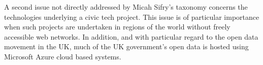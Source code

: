 A second issue not directly addressed by Micah Sifry’s taxonomy concerns the technologies underlying a civic tech project.
This issue is of particular importance when such projects are undertaken in regions of the world without freely accessible web networks.
In addition, and with particular regard to the open data movement in the UK, much of the UK government's open data is hosted using Microsoft Azure cloud based systems.